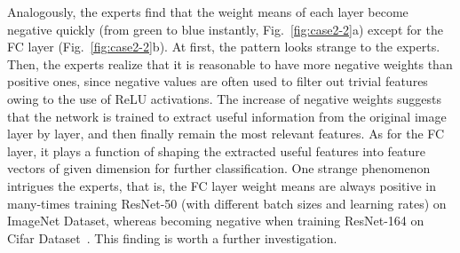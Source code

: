 \documentclass[format=acmsmall, review=false, screen=true]{acmart}
\newcommand{\dy}{\textcolor[rgb]{0,0,0}}
\begin{document}
Analogously, the experts find that the weight means of each layer become negative quickly (from green to blue instantly, Fig.~\ref{fig:case2-2}a) except for the FC layer (Fig.~\ref{fig:case2-2}b).
At first, the pattern looks strange to the experts.
Then, the experts realize that it is reasonable to have more negative weights than positive ones, since negative values are often used to filter out trivial features owing to the use of ReLU activations.
The increase of negative weights suggests that the network is trained to extract useful information from the original image layer by layer, and then finally remain the most relevant features.
\dy{As for the FC layer, it plays a function of shaping the extracted useful features into feature vectors of given dimension for further classification. One strange phenomenon intrigues the experts, that is, the FC layer weight means are always positive in many-times training ResNet-50 (with different batch sizes and learning rates) on ImageNet Dataset, whereas becoming negative when training ResNet-164 on Cifar Dataset~\cite{krizhevsky2009learning}. This finding is worth a further investigation.}%
\end{document}
